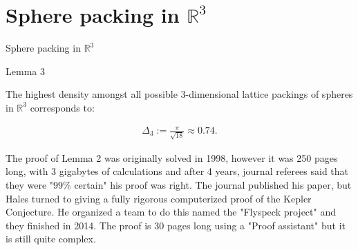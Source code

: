 \documentclass[10pt]{beamer}
\begin{document}
\section{Sphere packing in $\mathbb{R}^3$}
\begin{frame}{Sphere packing in $\mathbb{R}^3$}

    
    \begin{block}{Lemma 3}
    
    The highest density amongst all possible $3$-dimensional lattice packings of spheres in $\mathbb{R}^3$ corresponds to: 

  \begin{equation} \label{6.4}
    \begin{split}
        \Delta_3 := \frac{\pi}{\sqrt{18}} \approx 0.74.
    \end{split}
    \end{equation}
    
    \end{block}
    
    
    The proof of Lemma 2 was originally solved in 1998, however it was 250 pages long, with 3 gigabytes of calculations and after 4 years, journal referees said that they were "$99\%$ certain" his proof was right. The journal published his paper, but Hales turned to giving a fully rigorous computerized proof of the Kepler Conjecture.   He organized a team to do this named the "Flyspeck project" and they finished in 2014. The proof is $30$ pages long using a "Proof assistant" but it is still quite complex. \cite{hales2017formal}
    
\end{frame}
\end{document}
